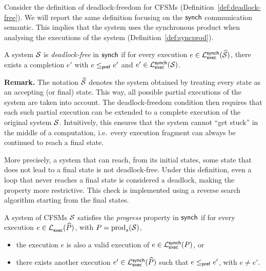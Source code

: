 Consider the definition of deadlock-freedom for CFSMs 
(Definition~\ref{def:deadlock-free}). We will report the same
definition focusing on the $\mathsf{synch}$ communication semantic. This implies 
that the system uses the synchronous product when analysing the 
executions of the system (Definition~\ref{def:syncprod}).

\bigskip

\begin{definition}
A system $\mathcal{S}$ is \emph{deadlock-free} in $\mathsf{synch}$  
if for every execution 
$e \in \mathcal{L}_{\mathsf{exec}}^{\mathsf{synch}}(\widehat{\mathcal{S}})$,  
there exists a completion $e'$ with $e \mathrel{\leq_{\mathsf{pref}}} e'$ and  
$e' \in \mathcal{L}_{\mathsf{exec}}^{\mathsf{synch}}(\mathcal{S})$.  
\end{definition}

\textbf{Remark.} The notation $\widehat{\mathcal{S}}$ denotes the 
system obtained by treating every state as an accepting (or final) state. 
This way, all possible partial executions of the system are taken 
into account. The deadlock-freedom condition then requires that each 
such partial execution can be extended to a complete execution of the 
original system $\mathcal{S}$. Intuitively, this ensures that the system 
cannot ``get stuck'' in the middle of a computation, i.e.\ every 
execution fragment can always be continued to reach a final state.  

More precisely, a system that can reach, from its initial states, some state
that does not lead to a final state is not deadlock-free. Under this definition,
even a loop that never reaches a final state is considered a deadlock,
making the property more restrictive. This check is implemented using a
reverse search algorithm starting from the final states.



\bigskip

\begin{definition}[Progress]\label{def:progress}
A system of CFSMs $\mathcal{S}$ satisfies the \emph{progress} property in $\mathsf{synch}$
if for every execution $e \in \mathcal{L}_{\mathsf{exec}}^{}(\widehat{P})$, 
with $P = \mathrm{prod}_s(\mathcal{S})$,
\begin{itemize}
    \item the execution $e$ is also a valid execution of 
          $e\in \mathcal{L}_{\mathsf{exec}}^{\mathsf{synch}}(P)$, or
    \item there exists another execution 
          $e'\in\mathcal{L}_{\mathsf{exec}}^{\mathsf{synch}}(\widehat{P})$
          such that $e \mathrel{\leq_{\mathsf{pref}}} e'$, with $e \neq e'$.
\end{itemize}
\end{definition}

